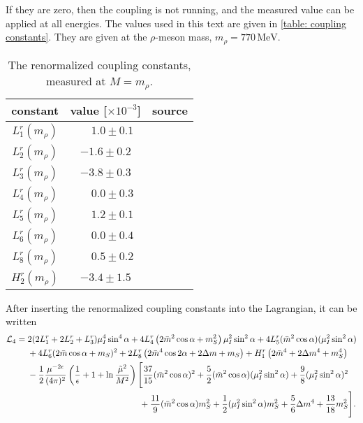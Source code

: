 If they are zero, then the coupling is not running, and the measured value can be applied at all energies.
The values used in this text are given in \autoref{table: coupling constants}.
They are given at the $\rho$-meson mass, $m_\rho = 770\, \text{MeV}$.
%
\begin{table}
    \centering
    \def\arraystretch{1.2}
    \caption{The renormalized coupling constants, measured at $M = m_\rho$.}
    \label{table: coupling constants}
    \begin{tabular}{c c c}
        \hline \hline
        constant & value [$\times 10^{-3}$] & source \\
        \hline
        $L_1^r(m_\rho)$ & $\phantom{-}1.0 \pm 0.1 $ & \autocite{bijnensMesonicLowEnergyConstants2014} \\
        $L_2^r(m_\rho)$ & $-1.6 \pm 0.2 $ & \autocite{bijnensMesonicLowEnergyConstants2014} \\
        $L_3^r(m_\rho)$ & $-3.8 \pm 0.3 $ & \autocite{bijnensMesonicLowEnergyConstants2014} \\
        $L_4^r(m_\rho)$ & $\phantom{-}0.0 \pm 0.3 $ & \autocite{bijnensMesonicLowEnergyConstants2014} \\
        $L_5^r(m_\rho)$ & $\phantom{-}1.2 \pm 0.1 $ & \autocite{bijnensMesonicLowEnergyConstants2014} \\
        $L_6^r(m_\rho)$ & $\phantom{-}0.0 \pm 0.4 $ & \autocite{bijnensMesonicLowEnergyConstants2014} \\
        $L_8^r(m_\rho)$ & $\phantom{-}0.5 \pm 0.2 $ & \autocite{bijnensMesonicLowEnergyConstants2014} \\
        $H_2^r(m_\rho)$ & $-3.4 \pm 1.5 $ & \autocite{jaminFlavoursymmetryBreakingQuark2002} 
    \end{tabular}
\end{table}
%
After inserting the renormalized coupling constants into the Lagrangian, it can be written
%
\begin{align}
    \label{nlo static lagrangian}
    \nonumber
    \mathcal{L}_4
    = {}&
    2(2L_1^r + 2L_2^r + L_3^r) \mu_I^4 \sin^4\alpha
    + 4  L_4^r \left( 2 \bar m^2 \cos\alpha + m_S^2 \right) \mu_I^2\sin^2\alpha
    + 4 L_5^r (\bar m^2 \cos\alpha) (\mu_I^2  \sin^2 \alpha )
    \\ \nonumber
    & 
    + 4 L_6^r (2\bar m\cos\alpha + m_S)^2
    + 2 L_8^r \left(2 \bar m^4 \cos2\alpha + 2 \Delta m + m_S\right)
    + H_1^r \left(2\bar m^4 + 2\Delta m^4 + m_S^4 \right)
    \\ \nonumber
    &
    - \frac{1}{2}\frac{\mu^{-2\epsilon}}{(4\pi)^2}
    \left( \frac{1}{\epsilon} + 1 + \ln\frac{\tilde \mu^2}{M^2} \right)
    \Bigg[
        \frac{37}{15} (\bar m^2 \cos\alpha)^2
        +\frac{5}{2} (\bar m^2 \cos\alpha)(\mu_I^2\sin^2\alpha)
        +\frac{9}{8} (\mu_I^2\sin^2\alpha)^2 \\
        &
        \quad\quad\quad\quad\quad\quad\quad\quad\quad\quad\quad\quad\quad
        +\frac{11}{9} (\bar m^2 \cos\alpha)m_S^2
        +\frac{1}{2} (\mu_I^2\sin^2\alpha)m_S^2
        +\frac{5}{6} \Delta m^4
        +\frac{13}{18} m_S^2
    \Bigg].
\end{align}



